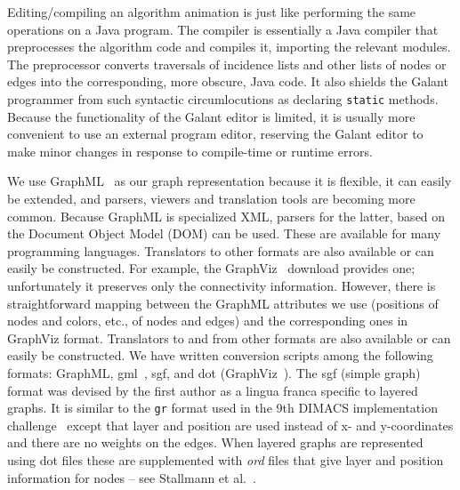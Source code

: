 Editing/compiling an algorithm animation is just like performing the same
operations on a Java program.
The compiler is essentially a Java
compiler that preprocesses the algorithm code
and compiles it, importing the relevant modules.
The preprocessor converts traversals of incidence lists and other
lists of nodes or edges into the corresponding, more obscure, Java code.
It also shields the Galant programmer from such syntactic circumlocutions
as declaring \texttt{static} methods.
Because the functionality of the Galant editor is limited, it is usually more
convenient to use an external program editor, reserving the Galant editor to
make minor changes in response to compile-time or runtime errors.

We use GraphML~\cite{GraphML} as our graph representation because it is flexible, it can
easily be extended, and parsers, viewers and translation tools are becoming
more common.
Because GraphML is
specialized XML, parsers for the latter, based on the Document Object Model
(DOM) can be used. These are available for many programming languages.
Translators to other formats are also available or can easily be constructed.
For example, the GraphViz~\cite{GraphViz} download provides one;
unfortunately it preserves
only
the connectivity information.
However, there is straightforward mapping between the GraphML attributes we
use (positions of nodes and colors, etc., of nodes and edges) and the
corresponding ones in GraphViz format.
Translators to and from other formats are also available or can easily be constructed.
We have written conversion scripts among the following formats:
GraphML, gml~\cite{1999-TRPassau-Himsolt}, sgf, and dot (GraphViz~\cite{GraphViz}).
The sgf (simple graph) format was devised by the first author as a
lingua franca specific to layered graphs.
It is similar to the \texttt{gr} format used in the 9th DIMACS implementation
challenge~\cite{2006-DIMACS-Implementation}
except that layer and position are used instead of x- and y-coordinates
and
there are no weights on the edges.
When layered graphs are represented using
dot files these are supplemented with \emph{ord} files
that give layer and position information for nodes
-- see Stallmann et al.~\cite{2001-JEA-Stallmann}.

